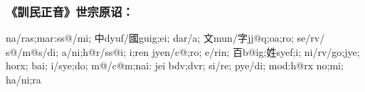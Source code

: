 \documentclass{article}
\begin{document}
\subsubsection*{《訓民正音》世宗原诏：}

\begin{korean}
 \begin{jamotext}
    na/ras;mar:ss@/mi;
    中dyuf/國guig;ei; dar/a;
    文mun/字jj@q;oa;ro; se/rv/ s@/m@s/di; a/ni;h@r/ss@i;
    i;ren jyen/c@;ro; e/rin; 百b@ig;姓syef;i;
    ni/rv/go;jye; horx; bai; i/sye;do;
    m@/c@m;nai: jei bdv;dvr; si/re; pye/di; mod:h@rx no;mi; ha/ni;ra
  \end{jamotext}
\end{korean}
\end{document}
